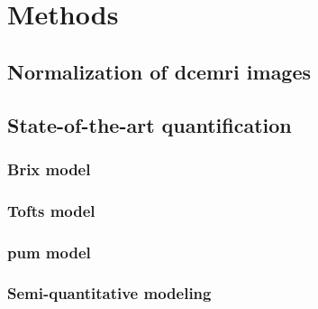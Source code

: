 \section{Methods}

\subsection{Normalization of \ac{dce}\ac{mri} images}

\subsection{State-of-the-art quantification}

\subsubsection{Brix model}

\subsubsection{Tofts model}

\subsubsection{\acs*{pum} model}

\subsubsection{Semi-quantitative modeling}


